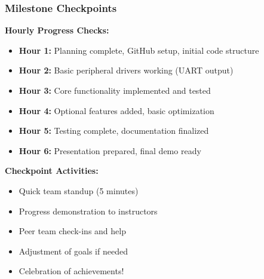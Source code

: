 \documentclass{beamer}
\begin{document}
\begin{frame}
\frametitle{Milestone Checkpoints}
\small \textbf{Hourly Progress Checks:}

\begin{itemize}
    \item \footnotesize \textbf{Hour 1:} Planning complete, GitHub setup, initial code structure
    \item \footnotesize \textbf{Hour 2:} Basic peripheral drivers working (UART output)
    \item \footnotesize \textbf{Hour 3:} Core functionality implemented and tested
    \item \footnotesize \textbf{Hour 4:} Optional features added, basic optimization
    \item \footnotesize \textbf{Hour 5:} Testing complete, documentation finalized
    \item \footnotesize \textbf{Hour 6:} Presentation prepared, final demo ready
\end{itemize}

\vspace{0.3cm}
\small \textbf{Checkpoint Activities:}
\begin{itemize}
    \item \footnotesize Quick team standup (5 minutes)
    \item \footnotesize Progress demonstration to instructors
    \item \footnotesize Peer team check-ins and help
    \item \footnotesize Adjustment of goals if needed
    \item \footnotesize Celebration of achievements!
\end{itemize}
\end{frame}
\end{document}

